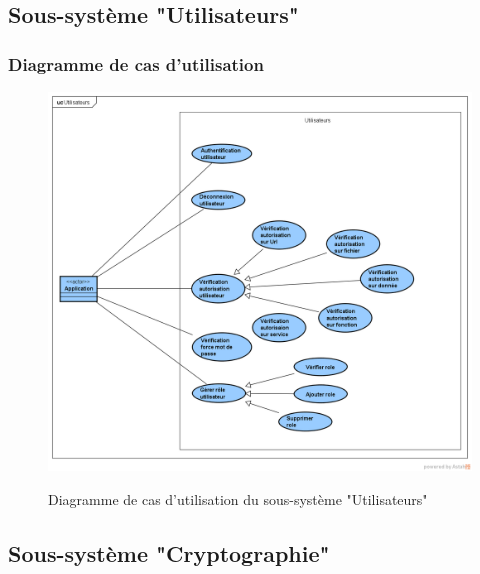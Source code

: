 \subsection{Sous-système "Utilisateurs"}
\subsubsection{Diagramme de cas d'utilisation}
\begin{figure}[H]
	\centering
	\begin{minipage}{12cm}
		\centering
		{\includegraphics[height=0.35\textheight, width=1\textwidth]{fig/Utilisateurs-use-case-diagram.png}}
	\end{minipage}
	\caption{Diagramme de cas d'utilisation du sous-système "Utilisateurs"}
	\label{fig:7.13}
\end{figure}


\subsection{Sous-système "Cryptographie"}
